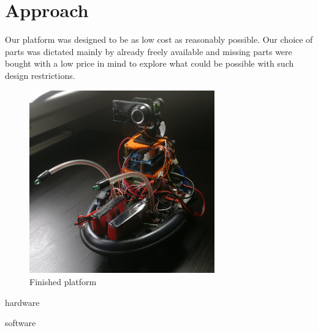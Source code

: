 \documentclass[class=article, crop=false]{standalone}
\begin{document}
\chapter{Approach}\label{cha:approach}

Our platform was designed to be as low cost as reasonably possible. Our choice of parts was dictated mainly by already freely available and missing parts were bought with a low price in mind to explore what could be possible with such design restrictions.

\begin{figure}
  \centering
  \includegraphics[width=8cm]{images/garry.jpg}
  \caption{Finished platform}
\end{figure}

{hardware}

{software}
\end{document}
